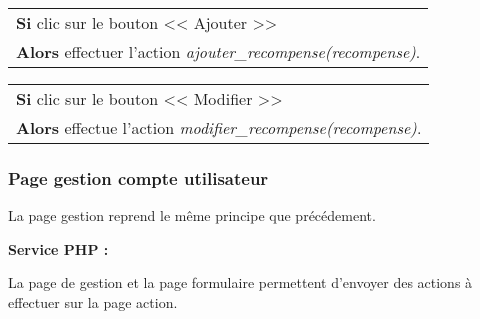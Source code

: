             \begin{center}
                \begin{tabular}{l}
                    \textbf{Si} clic sur le bouton << Ajouter >> \\
                    \textbf{Alors} effectuer l'action \emph{ajouter\_recompense(recompense)}.
                \end{tabular}
            \end{center}
            
            
            \begin{center}
                \begin{tabular}{l}
                    \textbf{Si} clic sur le bouton << Modifier >> \\
                    \textbf{Alors} effectue l'action \emph{modifier\_recompense(recompense)}.
                \end{tabular}
            \end{center}
            
        
        \newpage

		\subsubsection{Page gestion compte utilisateur}

			\begin{paragraphe}
                La page gestion reprend le même principe que précédement.
			\end{paragraphe}

			\begin{paragraphe}
				\textbf{Service PHP :}
			\end{paragraphe}
            
            \begin{paragraphe}
                La page de gestion et la page formulaire permettent d'envoyer des actions à effectuer sur la page action.
			\end{paragraphe}

